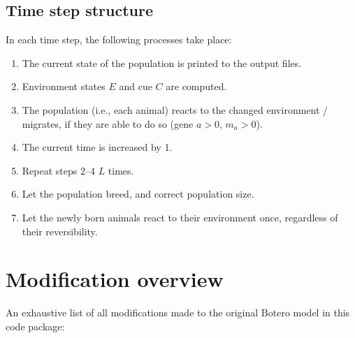 \documentclass[
12pt, %
a4paper, %
headinclude,footinclude %
]{article}
\newcommand{\modfont}[1]{\begingroup\color{red}#1\endgroup}
\begin{document}
\subsection{Time step structure}
In each time step, the following processes take place:

\begin{enumerate}
	\item The current state of the population is printed to the output files.
	\item Environment state\modfont{s} $E$ and cue $C$ are computed.
	\item The population (i.e., each animal) reacts to the changed environment \modfont{/ migrates}, if they are able to do so (gene $a>0$\modfont{, $m_a>0$}).
	\item The current time is increased by 1.
	\item Repeat steps 2--4 $L$ times.
	\item Let the population breed, and correct population size.
	\item Let the newly born animals react to their environment once, regardless of their reversibility.
\end{enumerate}

\section{Modification overview}
\label{sec:mod}
An exhaustive list of all modifications made to the original Botero model in this code package:
\end{document}
